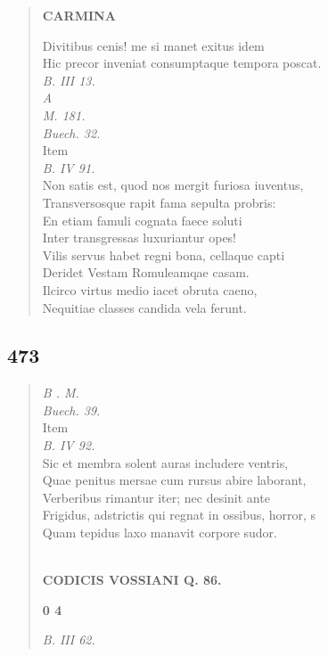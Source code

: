 \documentclass[11pt, a4paper]{report}
\begin{document}
\begin{verse}
    \begin{center} \textbf{CARMINA} \end{center} \marginpar{[346]} Divitibus cenis! me si manet exitus idem \\ Hic precor inveniat consumptaque tempora poscat. \\ \textit{B. III 13.} \\ \textit{A} \\ \textit{M. 181.} \\ \textit{Buech. 32.} \\ Item \\ \textit{B. IV 91.} \\ Non satis est, quod nos mergit furiosa iuventus, \\ Transversosque rapit fama sepulta probris: \\ En etiam famuli cognata faece soluti \\ Inter transgressas luxuriantur opes! \\ Vilis servus habet regni bona, cellaque capti \\ Deridet Vestam Romuleamqae casam. \\ Ilcirco virtus medio iacet obruta caeno, \\ Nequitiae classes candida vela ferunt. \\ 
      \end{verse}
  
            \subsection*{473}
      \begin{verse}
      \textit{B . M.} \\ \textit{Buech. 39.} \\ Item \\ \textit{B. IV 92.} \\ Sic et membra solent auras includere ventris, \\ Quae penitus mersae cum rursus abire laborant, \\ Verberibus rimantur iter; nec desinit ante \\ Frigidus, adstrictis qui regnat in ossibus, horror, s \\ Quam tepidus laxo manavit corpore sudor. \\ 
        ﻿\pagebreak 
    \begin{center} \textbf{CODICIS VOSSIANI Q. 86.} \end{center}\begin{center} \textbf{0 4} \end{center}\textit{B. III 62.} \\ 
      \end{verse}
  
\end{document}
